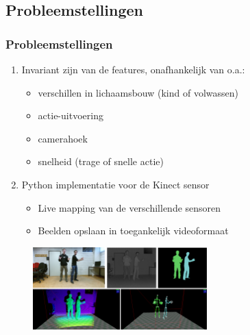 \documentclass[]{beamer}
\begin{document}
	\subsection{Probleemstellingen}
	\begin{frame}
	\frametitle{Probleemstellingen}

		\begin{enumerate}
			\item<1- > Invariant zijn van de features, onafhankelijk van o.a.:
				\begin{itemize}
				\item verschillen in lichaamsbouw (kind of volwassen)
				\item actie-uitvoering
				\item camerahoek
				\item snelheid (trage of snelle actie)
				\end{itemize}
			\item<2- > Python implementatie voor de Kinect sensor
				\begin{itemize}
				\item Live mapping van de verschillende sensoren
				\item Beelden opslaan in toegankelijk videoformaat
				\end{itemize}
			
		\end{enumerate}
		\begin{figure}
			\includegraphics[width=0.6\textwidth]{sensoren}
		\end{figure}

	\end{frame}
	
\end{document}
